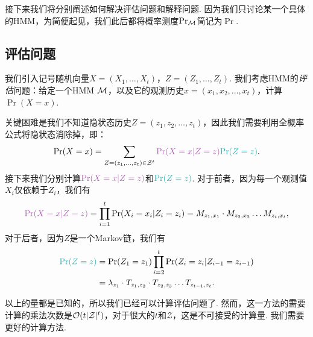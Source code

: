 接下来我们将分别阐述如何解决评估问题和解释问题. 因为我们只讨论某一个具体的HMM，为简便起见，我们此后都将概率测度$\Pr_\mathcal M$简记为$\Pr$.

\subsection{评估问题}

我们引入记号随机向量$X=(X_1,\dots,X_t)$，$Z=(Z_1,\dots,Z_t)$. 我们考虑HMM的\textit{评估}问题：给定一个HMM $\mathcal M$，以及它的观测历史$x=(x_1,x_2,\dots,x_t)$，计算$\Pr(X=x)$. 

关键困难是我们不知道隐状态历史$Z=(z_1,z_2,\dots,z_t)$，因此我们需要利用全概率公式将隐状态消除掉，即：
\[
    \Pr(X=x) =\sum_{Z=(z_1, \dots, z_t) \in \mathcal Z^t} \light{\Pr(X=x|Z=z)}\contrastlight{\Pr(Z=z)}.
\]
接下来我们分别计算$\light{\Pr(X=x|Z=z)}$和$\contrastlight{\Pr(Z=z)}$. 对于前者，因为每一个观测值$X_i$仅依赖于$Z_i$，我们有
\[
    \light{\Pr(X=x|Z=z)} = \prod_{i=1}^t \Pr(X_i = x_i| Z_i = z_i) = M_{z_1,x_1}\cdot M_{z_2,x_2}\dots M_{z_t,x_t},
\]
对于后者，因为$Z$是一个Markov链，我们有
\begin{align*}
    \contrastlight{\Pr(Z=z)} &= \Pr(Z_1 = z_1) \prod_{i=2}^t\Pr(Z_i = z_i| Z_{i-1} = z_{i-1}) 
    \\
    &= \lambda_{z_1}\cdot T_{z_1,z_2}\cdot T_{z_2,z_3}\dots T_{z_{t-1},z_t}.
\end{align*}

以上的量都是已知的，所以我们已经可以计算评估问题了. 然而，这一方法的需要计算的乘法次数是$\mathcal{O}(t|\mathcal Z|^t)$，对于很大的$t$和$\mathcal Z$，这是不可接受的计算量. 我们需要更好的计算方法.

